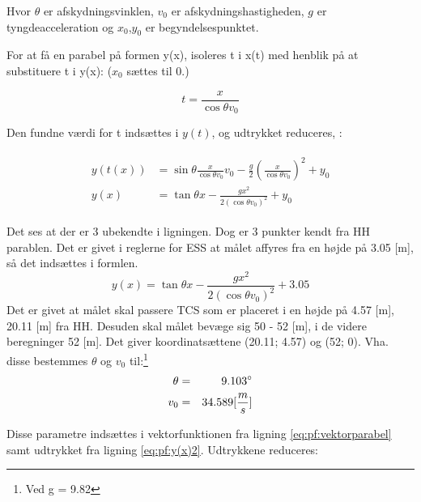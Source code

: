 Hvor $\theta$ er afskydningsvinklen, $v_0$ er afskydningshastigheden, $g$ er tyngdeacceleration og $x_0$,$y_0$ er begyndelsespunktet. 

For at få en parabel på formen y(x), isoleres t i x(t) med henblik på at substituere t i y(x): ($x_0$ sættes til 0.)

\begin{equation}
t = \frac{x}{\cos \theta v_0}
\label{eq:pf:x(t)}
\end{equation}

Den fundne værdi for t indsættes i $y(t)$, og udtrykket reduceres, \citep[Side. 67]{fund_of_physics}: 

\begin{align}
\begin{split}
y(t(x)) &= \sin \theta \frac{x}{\cos \theta v_0} v_0 - \frac{g}{2} \left(\frac{x}{\cos \theta v_0}\right)^2 + y_0 \\
y(x) &= \tan \theta x - \frac{gx^2}{2(\cos \theta v_0)^2} + y_0
\label{eq:pf:y(x(t))}
\end{split}
\end{align}


Det ses at der er 3 ubekendte i ligningen. Dog er 3 punkter kendt fra HH parablen. Det er givet i reglerne for ESS at målet affyres fra en højde på 3.05 [m], så det indsættes i formlen. 
\begin{equation}
y(x) = \tan \theta x - \frac{gx^2}{2(\cos \theta v_0)^2} + 3.05
\label{eq:pf:y(x)2}
\end{equation}
Det er givet at målet skal passere TCS som er placeret i en højde på 4.57 [m], 20.11 [m] fra HH. 
Desuden skal målet bevæge sig 50 - 52 [m], i de videre beregninger 52 [m]. Det giver koordinatsættene (20.11; 4.57) og (52; 0). Vha. disse bestemmes $\theta$ og $v_0$ til:\footnote{Ved g = 9.82}
\begin{eqnarray}
\theta &=& 9.103 \degree \\
v_0 &=& 34.589 [\frac{m}{s}]
\end{eqnarray}

Disse parametre indsættes i vektorfunktionen fra ligning \ref{eq:pf:vektorparabel} samt udtrykket fra ligning \ref{eq:pf:y(x)2}. Udtrykkene reduceres: 

